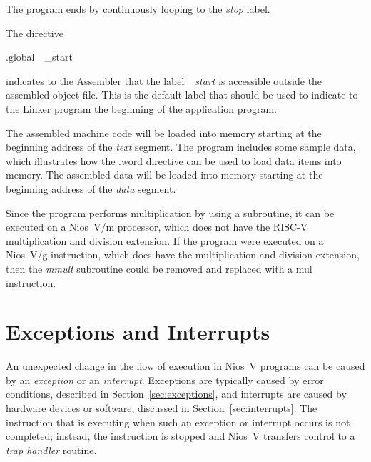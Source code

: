 \documentclass[11pt, twoside, pdftex]{article}
\begin{document}
\noindent
The program ends by continuously looping to the {\it stop} label.

The directive
\vspace{-\baselineskip}
\begin{center}
{\sf .global~~\_start}
\end{center} 
\noindent
indicates to the Assembler that the label {\it \_start} is accessible outside the
assembled object file. This is the default label that should be used to indicate to
the Linker program the beginning of the application program.

The assembled machine code will be loaded into memory starting 
at the beginning address of the {\it text} segment.
The program includes some sample data, which illustrates how the {\sf .word} directive 
can be used to load data items into memory. The assembled data will be loaded into 
memory starting at the beginning address of the {\it data} segment.

Since the program performs multiplication by using a subroutine, it can be executed on a
Nios~V/m processor, which does not have the RISC-V multiplication and division extension.
If the program were executed on a Nios~V/g instruction, which does have the multiplication
and division extension, then the {\it mmult} subroutine could be removed and replaced with a
{\sf mul} instruction. 

\section{Exceptions and Interrupts}
\label{sec:traps}

An unexpected change in the flow of execution in Nios~V programs can be caused by an
{\it exception} or an {\it interrupt}. Exceptions are typically caused by error conditions,
described in Section~\ref{sec:exceptions}, and interrupts are caused by hardware devices
or software, discussed in Section~\ref{sec:interrupts}. The instruction that is executing 
when such an exception or interrupt occurs is not completed; instead, the instruction is
stopped and Nios~V transfers control to a {\it trap handler} routine.
\end{document}
